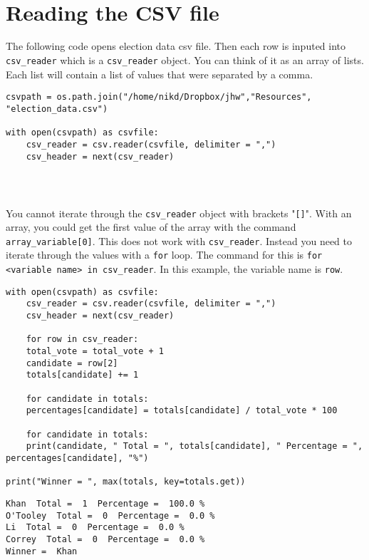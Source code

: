 \documentclass[11pt]{article}
\begin{document}
\begin{verbatim}



\end{verbatim}

\section{Reading the CSV file}
\label{sec:org2c6f759}

The following code opens election data csv file. Then each row is inputed into \texttt{csv\_reader} which is a \texttt{csv\_reader} object. You can think of it as an array of lists. Each list will contain a list of values that were separated by a comma. 

\begin{verbatim}
csvpath = os.path.join("/home/nikd/Dropbox/jhw","Resources", "election_data.csv")  

with open(csvpath) as csvfile:
    csv_reader = csv.reader(csvfile, delimiter = ",")
    csv_header = next(csv_reader)
\end{verbatim}

\begin{verbatim}



\end{verbatim}


You cannot iterate through the \texttt{csv\_reader} object with brackets "\texttt{[]}". With an array, you could get the first value of the array with the command \texttt{array\_variable[0]}. This does not work with \texttt{csv\_reader}. Instead you need to iterate through the values with a \texttt{for} loop. The command for this is 
\texttt{for <variable name> in csv\_reader}. In this example, the variable name is \texttt{row}. 

\begin{verbatim}
with open(csvpath) as csvfile:
    csv_reader = csv.reader(csvfile, delimiter = ",")
    csv_header = next(csv_reader)

    for row in csv_reader:
	total_vote = total_vote + 1
	candidate = row[2]
	totals[candidate] += 1

    for candidate in totals:
	percentages[candidate] = totals[candidate] / total_vote * 100

    for candidate in totals:
	print(candidate, " Total = ", totals[candidate], " Percentage = ", percentages[candidate], "%")

print("Winner = ", max(totals, key=totals.get))
\end{verbatim}

\begin{verbatim}
Khan  Total =  1  Percentage =  100.0 %
O'Tooley  Total =  0  Percentage =  0.0 %
Li  Total =  0  Percentage =  0.0 %
Correy  Total =  0  Percentage =  0.0 %
Winner =  Khan


\end{verbatim}
\end{document}
